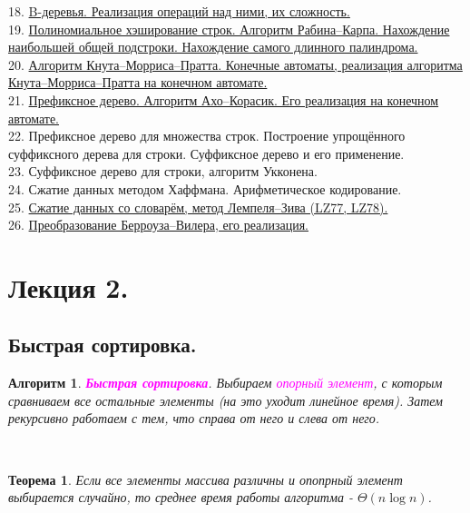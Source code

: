 \documentclass[a4paper]{article}
\theoremstyle{indented}
\newtheorem{theorem}{Теорема}
\newtheorem{alg}{Алгоритм}
\theoremstyle{definition}
\theoremstyle{remark}
\begin{document}
18. \hyperlink{t29}{B-деревья. Реализация операций над ними, их сложность.} \\ 

19. \hyperlink{t30}{Полиномиальное хэширование строк. Алгоритм Рабина–Карпа. Нахождение наибольшей общей подстроки. Нахождение самого длинного палиндрома.}  \\ 

20. \hyperlink{e3}{Алгоритм Кнута–Морриса–Пратта. Конечные автоматы, реализация алгоритма Кнута–Морриса–Пратта на конечном автомате.} \\ 

21. \hyperlink{t32}{Префиксное дерево. Алгоритм Ахо–Корасик. Его реализация на конечном автомате.} \\ 

22. Префиксное дерево для множества строк. Построение упрощённого суффиксного дерева для строки. Суффиксное дерево и его применение. \\ 

23. Суффиксное дерево для строки, алгоритм Укконена.  \\ 

24. Сжатие данных методом Хаффмана. Арифметическое кодирование. \\ 

25. \hyperlink{t35}{Сжатие данных со словарём, метод Лемпеля–Зива (LZ77, LZ78).} \\ 

26. \hyperlink{t37}{Преобразование Берроуза–Вилера, его реализация.}

\newpage

\section{Лекция 2.}

\subsection{Быстрая сортировка.}

\begin{alg}
    \textcolor{magenta}{\hypertarget{r1}{\textbf{Быстрая сортировка}}}. Выбираем \textcolor{magenta}{\hypertarget{d1}{\textit{опорный элемент}}}, с которым сравниваем все остальные элементы (на это уходит линейное время). Затем рекурсивно работаем с тем, что справа от него и слева от него.
\end{alg} \ 

\begin{theorem}
    Если все элементы массива различны и опопрный элемент выбирается случайно, то среднее время работы алгоритма - $\Theta(n\log n)$.
\end{theorem}
\end{document}

